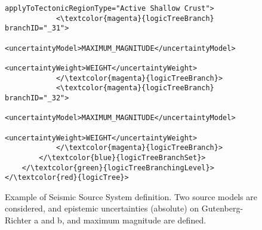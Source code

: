 \begin{figure}[htbp]
\begin{center}
\begin{Verbatim}[frame=single, commandchars=\\\{\},fontsize=\scriptsize, samepage=true]
		   applyToTectonicRegionType="Active Shallow Crust">
			<\textcolor{magenta}{logicTreeBranch} branchID="_31">
			   <uncertaintyModel>MAXIMUM_MAGNITUDE</uncertaintyModel>
			   <uncertaintyWeight>WEIGHT</uncertaintyWeight>
			</\textcolor{magenta}{logicTreeBranch}>
			<\textcolor{magenta}{logicTreeBranch} branchID="_32">
			   <uncertaintyModel>MAXIMUM_MAGNITUDE</uncertaintyModel>
			   <uncertaintyWeight>WEIGHT</uncertaintyWeight>
			</\textcolor{magenta}{logicTreeBranch}>
		</\textcolor{blue}{logicTreeBranchSet}>
	</\textcolor{green}{logicTreeBranchingLevel}>
</\textcolor{red}{logicTree}>
\end{Verbatim}
\caption{Example of Seismic Source System definition. Two source models are considered, and epistemic uncertainties (absolute) on Gutenberg-Richter a and b, and maximum magnitude are defined.}
\label{lt1}
\end{center}
\end{figure}

